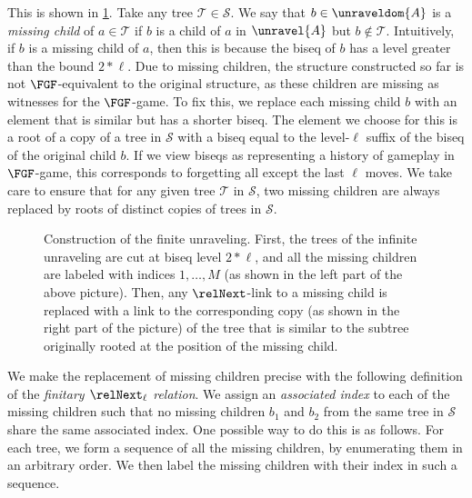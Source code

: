 This is shown in \cref{fig:finite-unraveling}.
Take any tree $\mathcal{T} \in \mathcal{S}$.
We say that $b \in \unraveldom{A}$ is a \emph{missing child} of $a \in \mathcal{T}$ if $b$ is a child of $a$ in $\unravel{A}$ but $b \notin \mathcal{T}$.
Intuitively, if $b$ is a missing child of $a$, then this is because the biseq of $b$ has a level greater than the bound $2 * \ell$.
Due to missing children, the structure constructed so far is not $\FGF$-equivalent to the original structure, as these children are missing as witnesses for the $\FGF$-game.
To fix this, we replace each missing child $b$ with an element that is similar but has a shorter biseq.
The element we choose for this is a root of a copy of a tree in $\mathcal{S}$ with a biseq equal to the level-$\ell$ suffix of the biseq of the original child $b$.
If we view biseqs as representing a history of gameplay in $\FGF$-game, this corresponds to forgetting all except the last $\ell$ moves.
We take care to ensure that for any given tree $\mathcal{T}$ in $\mathcal{S}$, two missing children are always replaced by roots of distinct copies of trees in $\mathcal{S}$.

\begin{figure}
  \centering
  
  \caption{Construction of the finite unraveling. First, the trees of the infinite unraveling are cut at biseq level $2*\ell$, and all the missing children are labeled with indices $1, \ldots, M$ (as shown in the left part of the above picture). Then, any $\relNext$-link to a missing child is replaced with a link to the corresponding copy (as shown in the right part of the picture) of the tree that is similar to the subtree originally rooted at the position of the missing child.}
  \label{fig:finite-unraveling}
\end{figure}

We make the replacement of missing children precise with the following definition of the \emph{finitary $\relNext_{\ell}$ relation}.
We assign an \emph{associated index} to each of the missing children such that no missing children $b_{1}$ and $b_{2}$ from the same tree in $\mathcal{S}$ share the same associated index.
One possible way to do this is as follows.
For each tree, we form a sequence of all the missing children, by enumerating them in an arbitrary order.
We then label the missing children with their index in such a sequence.

